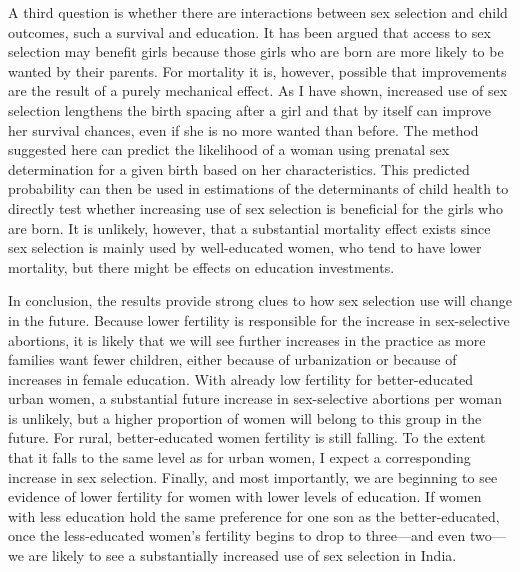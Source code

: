 \documentclass[12pt,letterpaper]{article}
\begin{document}
A third question is whether there are interactions between sex selection and child outcomes,
such a survival and education.
It has been argued that access to sex selection may benefit girls because those girls
who are born are more likely to be wanted by their parents.
For mortality it is, however, possible that improvements are the result of a purely 
mechanical effect.
As I have shown, increased use of sex selection lengthens the birth spacing after a girl 
and that by itself can improve her survival chances, even if she is no more wanted than before.
The method suggested here can predict the likelihood of a woman using prenatal sex 
determination for a given birth based on her characteristics.
This predicted probability can then be used in estimations of the determinants
of child health to directly test whether increasing use of sex selection is 
beneficial for the girls who are born.
It is unlikely, however, that a substantial mortality effect exists since sex 
selection is mainly used by well-educated women, who tend to have lower mortality, 
but there might be effects on education investments.

In conclusion, the results provide strong clues to how sex selection use will change in the future.
Because lower fertility is responsible for the increase in sex-selective abortions, 
it is likely that we will see further increases in the practice as more families 
want fewer children, either because of urbanization or because of increases in female 
education.
With already low fertility for better-educated urban women, a substantial future increase 
in sex-selective abortions per woman is unlikely, 
but a higher proportion of women will belong to this group in the future.
For rural, better-educated women fertility is still falling.
To the extent that it falls to the same level as for urban
women, I expect a corresponding increase in sex selection.
Finally, and most importantly, we are beginning to see evidence of lower fertility 
for women with lower levels of education.
If women with less education hold the same preference for one son as the better-educated,
once the less-educated women's fertility begins to drop to three---and even two---we are 
likely to see a substantially increased use of sex selection in India.






\newpage
\onehalfspacing



\end{document}
